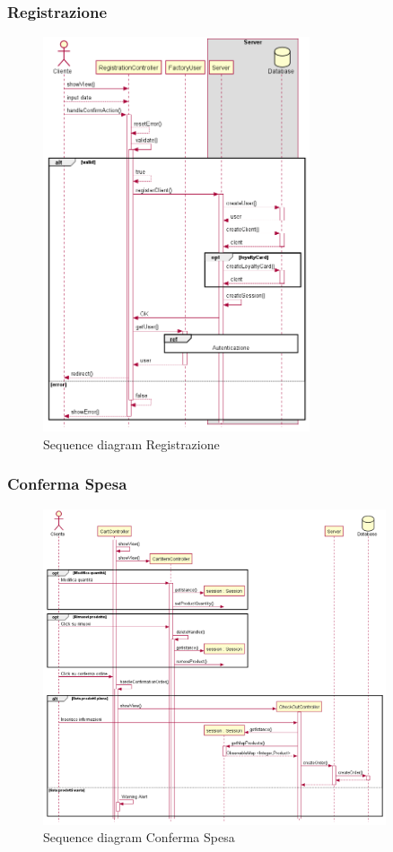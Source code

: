 \documentclass[12pt, a4paper]{report}
\begin{document}
\newpage

\subsubsection{Registrazione}

\begin{figure}[h]
  \centering
  \includegraphics[width=0.7\textwidth]{registration_sequence.png}
  \caption{Sequence diagram Registrazione}
\end{figure}

\newpage

\subsubsection{Conferma Spesa}

\begin{figure}[h]
  \centering
  \includegraphics[width=0.9\textwidth]{sequence_conferma_spesa.png}
  \caption{Sequence diagram Conferma Spesa}
\end{figure}
\end{document}
